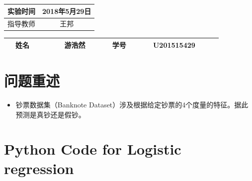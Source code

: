 \documentclass[UTF-8, a4paper, 10pt]{article}
\numberwithin{equation}{section}
\begin{document}
\begin{titlepage}
\begin{center}
\begin{table}[!hbp]
\begin{tabular}{|c|c|}
     		实验时间&\multicolumn{1}{c|}{2018年5月29日}\\
     		\hline
     		指导教师 & 王邦 \\
     		\hline
     		\end{tabular}     		
       \end{table}
       \vspace{2cm}
      \begin{table}[htbp]
      \centering
      \renewcommand\arraystretch{1.5}
     	\begin{tabular}{|c|c|c|c|}
     		\hline
            \qquad ~~姓名~~~~~  & \qquad ~~游浩然~~~~~  & \qquad 学号~~~~~ & \qquad U201515429~~~~~ \\
     		\hline
     		\end{tabular}
       \end{table}
       \date{2018年5月29日}
     \end{center}
\end{titlepage}

\section{问题重述}
\begin{itemize}
  \item 钞票数据集（Banknote Dataset）涉及根据给定钞票的4个度量的特征。据此预测是真钞还是假钞。
\end{itemize}

\section{Python Code for Logistic regression}
\end{document}
